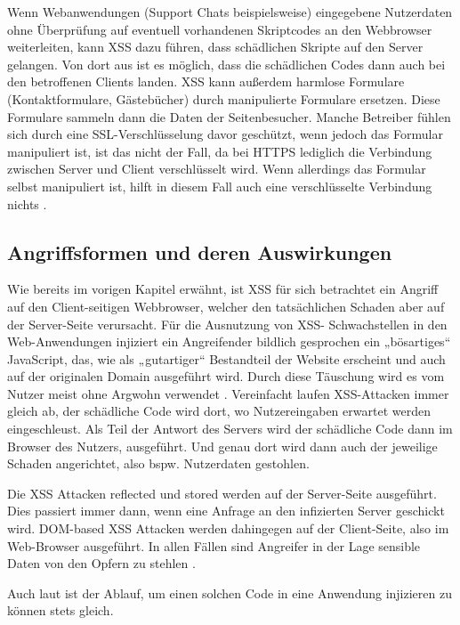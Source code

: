 Wenn Webanwendungen (Support Chats beispielsweise) eingegebene Nutzerdaten ohne Überprüfung auf eventuell vorhandenen Skriptcodes an den Webbrowser weiterleiten, kann XSS dazu führen, dass schädlichen Skripte auf den Server gelangen. Von dort aus ist es möglich, dass die schädlichen Codes dann auch bei den betroffenen Clients landen. XSS kann außerdem harmlose Formulare (Kontaktformulare, Gästebücher) durch manipulierte Formulare ersetzen. Diese Formulare sammeln dann die Daten der Seitenbesucher. Manche Betreiber fühlen sich durch eine SSL-Verschlüsselung davor geschützt, wenn jedoch das Formular manipuliert ist, ist das nicht der Fall, da bei HTTPS lediglich die Verbindung zwischen Server und Client verschlüsselt wird. Wenn allerdings das Formular selbst manipuliert ist, hilft in diesem Fall auch eine verschlüsselte Verbindung nichts \autocite{schuring2017}.

\subsection{Angriffsformen und deren Auswirkungen}
\label{subsection:attack_forms_and_their_impact}

Wie bereits im vorigen Kapitel erwähnt, ist XSS für sich betrachtet ein Angriff auf den Client-seitigen Webbrowser, welcher den tatsächlichen Schaden aber auf der Server-Seite verursacht. Für die Ausnutzung von XSS- Schwachstellen in den Web-Anwendungen injiziert ein Angreifender bildlich gesprochen ein „bösartiges“ JavaScript, das, wie als „gutartiger“ Bestandteil der Website erscheint und auch auf der originalen Domain ausgeführt wird. Durch diese Täuschung wird es vom Nutzer meist ohne Argwohn verwendet \autocite[5]{gupta2017}. Vereinfacht laufen XSS-Attacken immer gleich ab, der schädliche Code wird dort, wo Nutzereingaben erwartet werden eingeschleust. Als Teil der Antwort des Servers wird der schädliche Code dann im Browser des Nutzers, ausgeführt. Und genau dort wird dann auch der jeweilige Schaden angerichtet, also bspw. Nutzerdaten gestohlen.

Die XSS Attacken reflected und stored werden auf der Server-Seite ausgeführt. Dies passiert immer dann, wenn eine Anfrage an den infizierten Server geschickt wird. DOM-based XSS Attacken werden dahingegen auf der Client-Seite, also im Web-Browser ausgeführt. In allen Fällen sind Angreifer in der Lage sensible Daten von den Opfern zu stehlen \autocite{hydara2015a}.

Auch laut \textcite{mahmoud2017} ist der Ablauf, um einen solchen Code in eine Anwendung injizieren zu können stets gleich.

